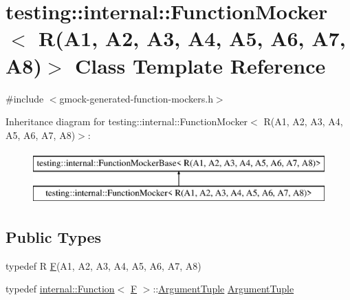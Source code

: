 \hypertarget{classtesting_1_1internal_1_1_function_mocker_3_01_r_07_a1_00_01_a2_00_01_a3_00_01_a4_00_01_a5_00_01_a6_00_01_a7_00_01_a8_08_4}{}\section{testing\+::internal\+::Function\+Mocker$<$ R(A1, A2, A3, A4, A5, A6, A7, A8)$>$ Class Template Reference}
\label{classtesting_1_1internal_1_1_function_mocker_3_01_r_07_a1_00_01_a2_00_01_a3_00_01_a4_00_01_a5_00_01_a6_00_01_a7_00_01_a8_08_4}


{\ttfamily \#include $<$gmock-\/generated-\/function-\/mockers.\+h$>$}

Inheritance diagram for testing\+::internal\+::Function\+Mocker$<$ R(A1, A2, A3, A4, A5, A6, A7, A8)$>$\+:\begin{figure}[H]
\begin{center}
\leavevmode
\includegraphics[height=2.000000cm]{d8/d6a/classtesting_1_1internal_1_1_function_mocker_3_01_r_07_a1_00_01_a2_00_01_a3_00_01_a4_00_01_a5_00_01_a6_00_01_a7_00_01_a8_08_4}
\end{center}
\end{figure}
\subsection*{Public Types}
\begin{DoxyCompactItemize}
\item 
typedef R \mbox{\hyperlink{classtesting_1_1internal_1_1_function_mocker_3_01_r_07_a1_00_01_a2_00_01_a3_00_01_a4_00_01_a5_00_01_a6_00_01_a7_00_01_a8_08_4_ad9749c93b0a17540778c5fa162a5fe6c}{F}}(A1, A2, A3, A4, A5, A6, A7, A8)
\item 
typedef \mbox{\hyperlink{structtesting_1_1internal_1_1_function}{internal\+::\+Function}}$<$ \mbox{\hyperlink{classtesting_1_1internal_1_1_function_mocker_3_01_r_07_a1_00_01_a2_00_01_a3_00_01_a4_00_01_a5_00_01_a6_00_01_a7_00_01_a8_08_4_ad9749c93b0a17540778c5fa162a5fe6c}{F}} $>$\+::\mbox{\hyperlink{classtesting_1_1internal_1_1_function_mocker_3_01_r_07_a1_00_01_a2_00_01_a3_00_01_a4_00_01_a5_00_01_a6_00_01_a7_00_01_a8_08_4_a57bc2be00815deac8964e2d2ae62fdd2}{Argument\+Tuple}} \mbox{\hyperlink{classtesting_1_1internal_1_1_function_mocker_3_01_r_07_a1_00_01_a2_00_01_a3_00_01_a4_00_01_a5_00_01_a6_00_01_a7_00_01_a8_08_4_a57bc2be00815deac8964e2d2ae62fdd2}{Argument\+Tuple}}
\end{DoxyCompactItemize}
